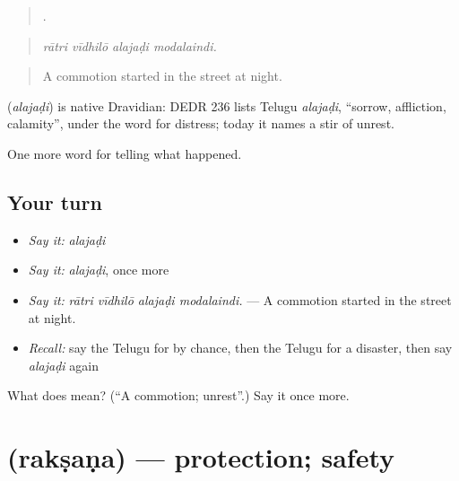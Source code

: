 \begin{quote}
   .
\end{quote}

\begin{quote}
\emph{rātri vīdhilō alajaḍi modalaindi.}
\end{quote}

\begin{quote}
A commotion started in the street at night.
\end{quote}

\begin{cousinweb}
\textbf{} (\emph{alajaḍi}) is native Dravidian: DEDR 236 lists Telugu \emph{alajaḍi}, \textquotedblleft{}sorrow, affliction, calamity\textquotedblright{}, under the word for distress; today it names a stir of unrest.
\end{cousinweb}

\begin{grammarlens}[title={What you've built}]
One more word for telling what happened.
\end{grammarlens}

\subsection*{Your turn}
\begin{itemize}
\raggedright
  \item \emph{Say it:} \emph{alajaḍi}
  \item \emph{Say it:} \emph{alajaḍi}, once more
  \item \emph{Say it:} \emph{rātri vīdhilō alajaḍi modalaindi.} — A commotion started in the street at night.
  \item \emph{Recall:} say the Telugu for by chance, then the Telugu for a disaster, then say \emph{alajaḍi} again
\end{itemize}

\begin{tcolorbox}[breakable,colback=teal!4,colframe=teal!35!black,title={Before you move on}]
What does  mean? (\textquotedblleft{}A commotion; unrest\textquotedblright{}.) Say it once more.
\end{tcolorbox}
\section[\texorpdfstring{\te{రక్షణ} (rakṣaṇa)}{రక్షణ (rakṣaṇa)}]{ (rakṣaṇa) — protection; safety}

